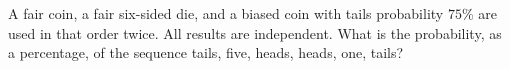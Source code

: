 A fair coin, a fair six-sided die, and a biased coin with tails probability $75\%$ are used in that order twice. All results are independent. What is the probability, as a percentage, of the sequence tails, five, heads, heads, one, tails?
